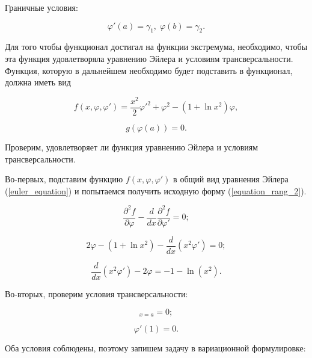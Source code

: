 \documentclass{article}
\begin{document}
\noindent Граничные условия:

\begin{equation}
	\varphi'(a) = \gamma_{1}, \; \varphi(b) = \gamma_{2}.
\end{equation}

Для того чтобы функционал достигал на функции экстремума, необходимо, чтобы эта функция удовлетворяла уравнению Эйлера и условиям трансверсальности. Функция, которую в дальнейшем необходимо будет подставить в функционал, должна иметь вид

\begin{equation}
	f(x, \varphi, \varphi') = \frac{x^2}{2}\varphi'^2 + \varphi^2 - (1+\ln{x^2})\varphi,
\end{equation}

\begin{equation}
	g(\varphi(a)) = 0.
\end{equation}

\noindent Проверим, удовлетворяет ли функция уравнению Эйлера и условиям трансверсальности. 

Во-первых, подставим функцию $f(x, \varphi, \varphi')$ в общий вид уравнения Эйлера (\ref{euler_equation}) и попытаемся получить исходную форму (\ref{equation_rang_2}).

\begin{equation}
	\frac{\partial^2 f}{\partial \varphi} - \frac{d}{dx}\frac{\partial^2 f}{\partial \varphi'} = 0;
\end{equation}

\begin{equation}
	2\varphi - (1 + \ln{x^2}) - \frac{d}{dx}(x^2 \varphi') = 0;
\end{equation}

\begin{equation}
	\frac{d}{dx}(x^2 \varphi') - 2\varphi = -1 - \ln(x^2).
\end{equation}

\noindent Во-вторых, проверим условия трансверсальности:

\begin{equation}
	[\frac{\partial^2 f}{\partial \varphi'} - \frac{\partial g}{d\varphi(a)}]_{x=a} = 0;
\end{equation}

\begin{equation}
	\varphi'(1) = 0.
\end{equation}

\noindent Оба условия соблюдены, поэтому запишем задачу в вариационной формулировке:
\end{document}
